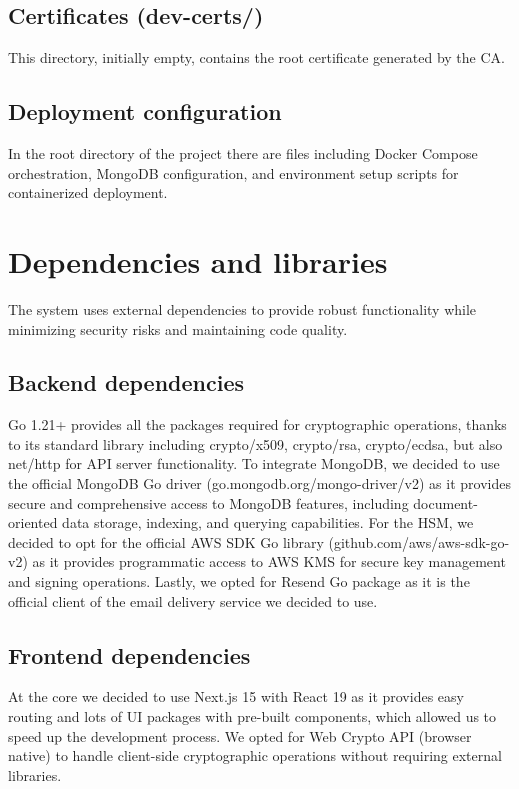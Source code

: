 \subsection{Certificates (dev-certs/)}
This directory, initially empty, contains the root certificate generated by the CA.

\subsection{Deployment configuration}
In the root directory of the project there are files including Docker Compose 
orchestration, MongoDB configuration, and environment setup scripts for 
containerized deployment.

\section{Dependencies and libraries}

The system uses external dependencies to provide robust functionality 
while minimizing security risks and maintaining code quality.

\subsection{Backend dependencies}
Go 1.21+ provides all the packages required for cryptographic operations, thanks to 
its standard library including crypto/x509, crypto/rsa, crypto/ecdsa, but also net/http 
for API server functionality.
To integrate MongoDB, we decided to use the official MongoDB Go driver (go.mongodb.org/mongo-driver/v2) 
as it provides secure and comprehensive access to MongoDB features, including 
document-oriented data storage, indexing, and querying capabilities.
For the HSM, we decided to opt for the official AWS SDK Go library (github.com/aws/aws-sdk-go-v2) 
as it provides programmatic access to AWS KMS for secure key management and signing 
operations.
Lastly, we opted for Resend Go package as it is the official client of the email delivery service
we decided to use.


\subsection{Frontend dependencies}

At the core we decided to use Next.js 15 with React 19 as it provides easy routing and
lots of UI packages with pre-built components, which allowed us to speed up the development process.
We opted for Web Crypto API (browser native) to handle 
client-side cryptographic operations without requiring external libraries.

